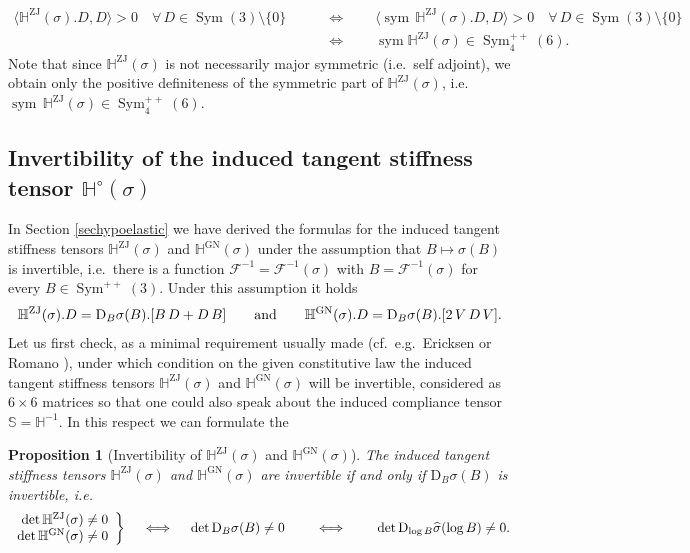 \documentclass[10pt]{article}
\newcounter{theoremCounter}
\numberwithin{theoremCounter}{section}
\theoremstyle{plain}
\newtheorem{prop}[theoremCounter]{Proposition}
\theoremstyle{definition}
\newcommand{\DD}{\mathrm{D}}
\DeclareMathOperator{\Sym}{Sym}
\DeclareMathOperator{\sym}{sym}
\DeclareMathOperator{\ZJ}{ZJ}
\DeclareMathOperator{\GN}{GN}
\def\H{\mathbb{H}}
\numberwithin{equation}{section}
\begin{document}
	\begin{equation}
	\label{eqlinstability}
	\begin{alignedat}{2}
	\langle \H^{\ZJ}(\sigma).D,D \rangle > 0 \quad \forall \, D \in \Sym(3) \! \setminus \! \{0\} \qquad &\iff \qquad \langle \sym \, \H^{\ZJ}(\sigma).D, D \rangle > 0 \quad \forall \, D \in \Sym(3) \! \setminus \! \{0\} \\
	&\iff \qquad \sym \H^{\ZJ}(\sigma) \in \Sym^{++}_4(6).
	\end{alignedat}
	\end{equation}
Note that since $\H^{\ZJ}(\sigma)$ is not necessarily major symmetric (i.e.\ self adjoint), we obtain only the positive definiteness of the symmetric part of $\H^{\ZJ}(\sigma)$, i.e.~$\sym \, \H^{\ZJ}(\sigma) \in \Sym^{++}_4(6)$. 
%
\subsection{Invertibility of the induced tangent stiffness tensor $\H^{\circ}(\sigma)$}
%
In Section \ref{sechypoelastic} we have derived the formulas for the induced tangent stiffness tensors $\H^{\ZJ}(\sigma)$ and $\H^{\GN}(\sigma)$ under the assumption that $B \mapsto \sigma(B)$ is invertible, i.e.~there is a function $\mathcal{F}^{-1} = \mathcal{F}^{-1}(\sigma)$ with $B = \mathcal{F}^{-1}(\sigma)$ for every $B \in \Sym^{++}(3)$. Under this assumption it holds
	\begin{align}
	\label{eqraterepresnt1}
	\H^{\rm ZJ}(\sigma).D = \DD_B\sigma(B).[B \, D + D \, B] \qquad \textnormal{and} \qquad \H^{\rm GN}(\sigma).D =\DD_B\sigma(B).[2 \, V \, D \, V].
	\end{align}
Let us first check, as a minimal requirement usually made (cf.~e.g.~Ericksen \cite{ericksen1958hypo} or Romano \cite{romano2011}), under which condition on the given constitutive law the induced tangent stiffness tensors $\H^{\ZJ}(\sigma)$ and $\H^{\GN}(\sigma)$ will be invertible, considered as $6 \times 6$ matrices so that one could also speak about the induced compliance tensor $\mathbb{S} = \H^{-1}$. In this respect we can formulate the
%
\begin{prop}[Invertibility of $\H^{\ZJ}(\sigma)$ and $\H^{\GN}(\sigma)$] \label{propinvert1}
The induced tangent stiffness tensors $\H^{\ZJ}(\sigma)$ and $\H^{\GN}(\sigma)$ are invertible if and only if $\DD_B \sigma(B)$ is invertible, i.e.
	\begin{align}
	\left.\begin{array}{r}
	\det \H^{\rm ZJ}(\sigma) \neq 0\\
	\det \H^{\rm GN}(\sigma) \neq 0
	\end{array}\right\} \quad \iff \quad \det \DD _B\sigma(B) \neq 0 \qquad \iff \qquad \det \DD_{\log B} \widehat \sigma(\log B) \neq 0.
	\end{align}
\end{prop}
\end{document}

